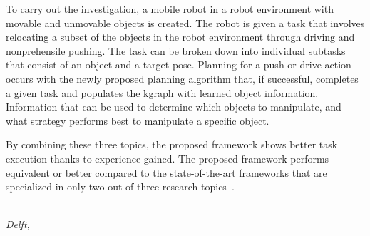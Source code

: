 To carry out the investigation, a mobile robot in a robot environment with movable and unmovable objects is created. The robot is given a task that involves relocating a subset of the objects in the robot environment through driving and nonprehensile pushing. The task can be broken down into individual subtasks that consist of an object and a target pose. Planning for a push or drive action occurs with the newly proposed planning algorithm that, if successful, completes a given task and populates the \acl{kgraph} with learned object information. Information that can be used to determine which objects to manipulate, and what strategy performs best to manipulate a specific object.\bs

By combining these three topics, the proposed framework shows better task execution thanks to experience gained. The proposed framework performs equivalent or better compared to the state-of-the-art frameworks that are specialized in only two out of three research topics~\cite{ellis_navigation_2022,sabbaghnovin_model_2021,scholz_navigation_2016,vega-brown_asymptotically_2020,wang_affordancebased_2020}.\bs

\begin{flushright}
{\makeatletter\itshape
    \@author\\
    Delft, \monthname{} \the\year{}
\makeatother}
\end{flushright}
